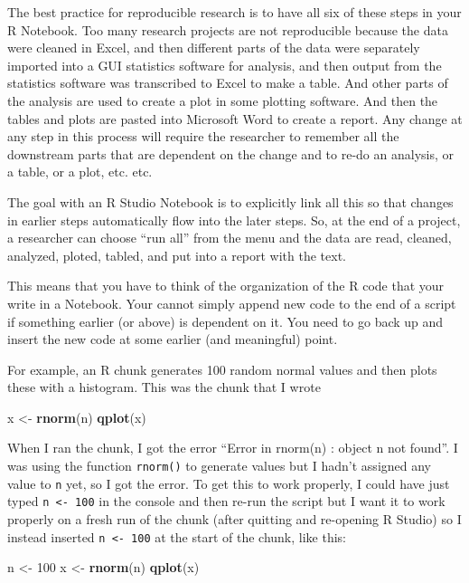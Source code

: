 \documentclass[]{book}
\newenvironment{Shaded}{\begin{snugshade}}{\end{snugshade}}
\newcommand{\KeywordTok}[1]{\textcolor[rgb]{0.13,0.29,0.53}{\textbf{#1}}}
\newcommand{\DecValTok}[1]{\textcolor[rgb]{0.00,0.00,0.81}{#1}}
\newcommand{\StringTok}[1]{\textcolor[rgb]{0.31,0.60,0.02}{#1}}
\newcommand{\NormalTok}[1]{#1}
\theoremstyle{definition}
\theoremstyle{definition}
\theoremstyle{definition}
\theoremstyle{remark}
\begin{document}
The best practice for reproducible research is to have all six of these
steps in your R Notebook. Too many research projects are not
reproducible because the data were cleaned in Excel, and then different
parts of the data were separately imported into a GUI statistics
software for analysis, and then output from the statistics software was
transcribed to Excel to make a table. And other parts of the analysis
are used to create a plot in some plotting software. And then the tables
and plots are pasted into Microsoft Word to create a report. Any change
at any step in this process will require the researcher to remember all
the downstream parts that are dependent on the change and to re-do an
analysis, or a table, or a plot, etc. etc.

The goal with an R Studio Notebook is to explicitly link all this so
that changes in earlier steps automatically flow into the later steps.
So, at the end of a project, a researcher can choose ``run all'' from
the menu and the data are read, cleaned, analyzed, ploted, tabled, and
put into a report with the text.

This means that you have to think of the organization of the R code that
your write in a Notebook. Your cannot simply append new code to the end
of a script if something earlier (or above) is dependent on it. You need
to go back up and insert the new code at some earlier (and meaningful)
point.

For example, an R chunk generates 100 random normal values and then
plots these with a histogram. This was the chunk that I wrote

\begin{Shaded}
\begin{Highlighting}[]
\NormalTok{x <-}\StringTok{ }\KeywordTok{rnorm}\NormalTok{(n)}
\KeywordTok{qplot}\NormalTok{(x)}
\end{Highlighting}
\end{Shaded}

When I ran the chunk, I got the error ``Error in rnorm(n) : object n not
found''. I was using the function \texttt{rnorm()} to generate values
but I hadn't assigned any value to \texttt{n} yet, so I got the error.
To get this to work properly, I could have just typed
\texttt{n\ \textless{}-\ 100} in the console and then re-run the script
but I want it to work properly on a fresh run of the chunk (after
quitting and re-opening R Studio) so I instead inserted
\texttt{n\ \textless{}-\ 100} at the start of the chunk, like this:

\begin{Shaded}
\begin{Highlighting}[]
\NormalTok{n <-}\StringTok{ }\DecValTok{100}
\NormalTok{x <-}\StringTok{ }\KeywordTok{rnorm}\NormalTok{(n)}
\KeywordTok{qplot}\NormalTok{(x)}
\end{Highlighting}
\end{Shaded}
\end{document}
